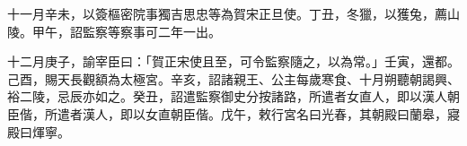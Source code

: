 \begin{pinyinscope}
 十一月辛未，以簽樞密院事獨吉思忠等為賀宋正旦使。丁丑，冬獵，以獲兔，薦山陵。甲午，詔監察等察事可二年一出。



 十二月庚子，諭宰臣曰：「賀正宋使且至，可令監察隨之，以為常。」壬寅，還都。己酉，賜天長觀額為太極宮。辛亥，詔諸親王、公主每歲寒食、十月朔聽朝謁興、裕二陵，忌辰亦如之。癸丑，詔遣監察御史分按諸路，所遣者女直人，即以漢人朝臣偕，所遣者漢人，即以女直朝臣偕。戊午，敕行宮名曰光春，其朝殿曰蘭皋，寢殿曰煇寧。



\end{pinyinscope}